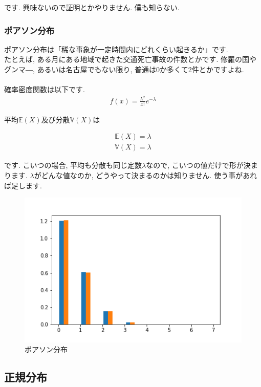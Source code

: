 \documentclass[11pt,a4paper]{jsarticle}                    %
\begin{document}
です. 興味ないので証明とかやりません. 僕も知らない.

\subsubsection{ポアソン分布}
ポアソン分布は「稀な事象が一定時間内にどれくらい起きるか」です.\\
たとえば, ある月にある地域で起きた交通死亡事故の件数とかです. 修羅の国やグンマ―, あるいは名古屋でもない限り, 普通は0か多くて2件とかですよね.\\
\\
確率密度関数は以下です.
\begin{eqnarray}
f(x) = \frac{\lambda^x}{x!}e^{-\lambda}
\end{eqnarray}

平均$\mathbb{E}(X)$及び分散$\mathbb{V}(X)$は

\begin{eqnarray}
\mathbb{E}(X) = \lambda\\
\mathbb{V}(X) = \lambda
\end{eqnarray}

です. こいつの場合, 平均も分散も同じ定数$\lambda$なので, こいつの値だけで形が決まります. $\lambda$がどんな値なのか, どうやって決まるのかは知りません. 使う事があれば足します.\\

\begin{figure}[H]
\label{im:poisson}
  \centering
  \includegraphics[width=120mm,bb=0 0 432 288]{../figures/poisson.png}
  \caption{ポアソン分布}
\end{figure}

\subsection{正規分布}
\end{document}
